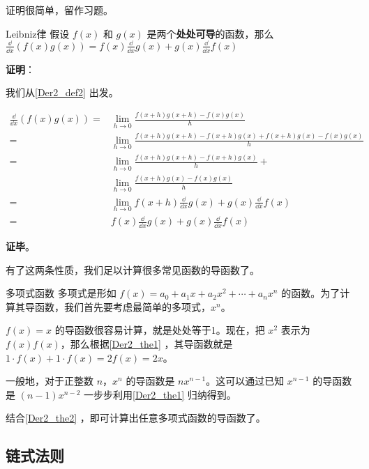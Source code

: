 证明很简单，留作习题。

\begin{theorem}{Leibniz律}\label{Der2_the1}
假设 $f(x)$ 和 $g(x)$ 是两个\textbf{处处可导}的函数，那么 $\frac{\dd}{\dd x}(f(x)g(x))=f(x)\frac{\dd}{\dd x}g(x)+g(x)\frac{\dd}{\dd x}f(x)$
\end{theorem}

\textbf{证明}：

我们从\autoref{Der2_def2} 出发。

\begin{equation}
\begin{aligned}
\frac{\dd}{\dd x}(f(x)g(x))=&\lim\limits_{h\to 0}\frac{f(x+h)g(x+h)-f(x)g(x)}{h}\\
=&\lim\limits_{h\to 0}\frac{f(x+h)g(x+h)-f(x+h)g(x)+f(x+h)g(x)-f(x)g(x)}{h}\\
=&\lim\limits_{h\to 0}\frac{f(x+h)g(x+h)-f(x+h)g(x)}{h}+\\&\lim\limits_{h\to 0}\frac{f(x+h)g(x)-f(x)g(x)}{h}\\
=&\lim\limits_{h\to 0}f(x+h)\frac{\dd}{\dd x}g(x)+g(x)\frac{\dd}{\dd x}f(x)\\
=&f(x)\frac{\dd}{\dd x}g(x)+g(x)\frac{\dd}{\dd x}f(x)
\end{aligned}
\end{equation}

\textbf{证毕}。

有了这两条性质，我们足以计算很多常见函数的导函数了。

\begin{example}{多项式函数}
多项式是形如 $f(x)=a_0+a_1x+a_2x^2+\cdots+a_nx^n$ 的函数。为了计算其导函数，我们首先要考虑最简单的多项式，$x^n$。

$f(x)=x$ 的导函数很容易计算，就是处处等于1。现在，把 $x^2$ 表示为 $f(x)f(x)$，那么根据\autoref{Der2_the1} ，其导函数就是 $1\cdot f(x)+1\cdot f(x)=2f(x)=2x$。

一般地，对于正整数 $n$，$x^n$ 的导函数是 $nx^{n-1}$。这可以通过已知 $x^{n-1}$ 的导函数是 $(n-1)x^{n-2}$ 一步步利用\autoref{Der2_the1} 归纳得到。

结合\autoref{Der2_the2} ，即可计算出任意多项式函数的导函数了。
\end{example}


\subsection{链式法则}













